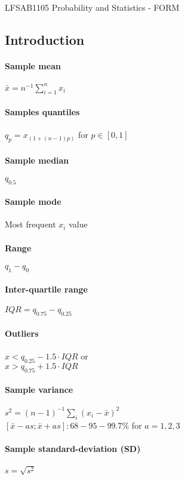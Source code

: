 \documentclass[paper=a4,fontsize=8pt,pagesize,DIV=calc]{scrartcl}
\begin{document}

\begin{center}
{\Large LFSAB1105 Probability and Statistics - FORM}
\end{center}

\begin{multicols}{3}

\section{Introduction}
\paragraph{Sample mean} $\bar{x}=n^{-1}\sum^n_{i=1} x_i$
\paragraph{Samples quantiles} $q_p=x_{(1+(n-1)p)}$ for $p \in [0,1]$
\paragraph{Sample median} $q_{0.5}$
\paragraph{Sample mode} Most frequent $x_i$ value
\paragraph{Range} $q_1-q_0$
\paragraph{Inter-quartile range} $IQR=q_{0.75}-q_{0.25}$
\paragraph{Outliers} $x<q_{0.25}-1.5 \cdot IQR$ or \\$ x>q_{0.75}+1.5 \cdot IQR$
\paragraph{Sample variance} $s^2=(n-1)^{-1} \sum_i (x_i-\bar{x})^2$\\$[\bar{x}-as;\bar{x}+as]: 68-95-99.7
\%$ for $a=1,2,3$
\paragraph{Sample standard-deviation (SD)} $s=\sqrt{s^2}$

\end{multicols}
\end{document}
